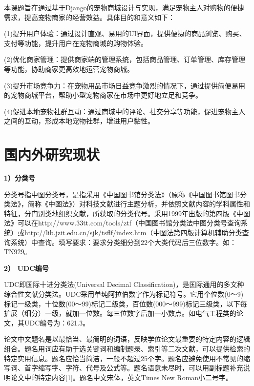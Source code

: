 本课题旨在通过基于Django的宠物商城设计与实现，满足宠物主人对购物的便捷需求，提高宠物商家的经营效益。具体目的和意义如下：

(1)提升用户体验：通过设计直观、易用的UI界面，提供便捷的商品浏览、购买、支付等功能，提升用户在宠物商城的购物体验。

(2)优化商家管理：提供商家端的管理系统，包括商品管理、订单管理、库存管理等功能，协助商家更高效地运营宠物商城。

(3)提升市场竞争力：在宠物用品市场日益竞争激烈的情况下，通过提供简便易用的宠物商城平台，帮助小型宠物商家在市场中更好地立足和竞争。

(4)促进本地宠物社群互动：通过商城中的评论、社交分享等功能，促进宠物主人之间的互动，形成本地宠物社群，增进用户黏性。


\section{国内外研究现状}
\textbf{1）分类号}

分类号指中图分类号，是指采用《中国图书馆分类法》（原称《中国图书馆图书分类法》，简称《中图法》）对科技文献进行主题分析，并依照文献内容的学科属性和特征，分门别类地组织文献，所获取的分类代号。采用1999年出版的第四版《中图法》可以在http://www.33tt.com/tools/ztf（中国图书馆分类法中图分类号查询系统）或http://lib.jzit.edu.cn/sjk/tsflf/index.htm（中图法第四版计算机辅助分类查询系统）中查询。填写要求：要求分类细分到22个大类代码后三位数字。如：TN929。

\textbf{2） UDC编号	}

UDC即国际十进分类法(Universal Decimal Classification)，是国际通用的多文种综合性文献分类法。UDC采用单纯阿拉伯数字作为标记符号。它用个位数(0～9)标记一级类，十位数(00～99)标记二级类，百位数(000～999)标记三级类，以下每扩展（细分）一级，就加一位数。每三位数字后加一小数点。如电气工程类的论文，其UDC编号为：621.3。


论文中文题名是以最恰当、最简明的词语，反映学位论文最重要的特定内容的逻辑组合。题名用词应有助于选关键词和编制题录、索引等二次文献，可以提供检索的特定实用信息。题名应恰当简洁，一般不超过25个字。题名应避免使用不常见的缩写词、首字缩写字、字符、代号及公式等。题名语意未尽时，可以用副标题补充说明论文中的特定内容[1]。题名中文宋体，英文Times New Roman小二号字。


